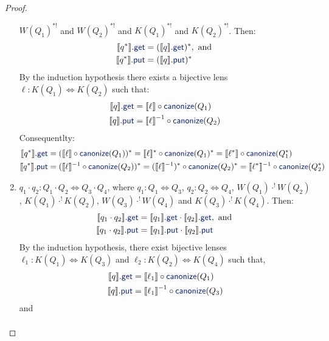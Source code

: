 \documentclass[acmsmall,review,anonymous]{acmart}
\newcommand{\kw}[1]{\textcolor{dkblue}{\ensuremath{\mathsf{#1}}}}
\newcommand{\canonize}{\ensuremath{\kw{canonize}}}
\newcommand{\get}{\ensuremath{\kw{get}}}
\newcommand{\lput}{\ensuremath{\kw{put}}}
\begin{document}
\begin{proof}
\begin{enumerate}
$W(Q_1)^{*!}$ and $W(Q_2)^{*!}$ and $K(Q_1)^{*!}$ and $K(Q_2)^{*!}$. Then:
\begin{align*}
\llbracket q^* \rrbracket.\get &= (\llbracket q \rrbracket.\get)^*, \text{
and }\\
\llbracket q^* \rrbracket.\lput &= (\llbracket q \rrbracket.\lput)^*
\end{align*}
By the induction hypothesis there exists a bijective lens $\ell : K(Q_1)
\Leftrightarrow K(Q_2)$ such that:
\begin{align*}
\llbracket q \rrbracket.\get &= \llbracket \ell \rrbracket \circ
\canonize(Q_1)\\
\llbracket q \rrbracket.\lput &= {\llbracket \ell \rrbracket}^{-1} \circ
\canonize(Q_2)
\end{align*}
Consequentlty:
\begin{align*}
\llbracket q^* \rrbracket.\get &= (\llbracket \ell \rrbracket \circ
\canonize(Q_1))^* = \llbracket \ell \rrbracket^* \circ
\canonize(Q_1)^* = \llbracket \ell^* \rrbracket \circ
\canonize(Q_1^*)\\
\llbracket q^* \rrbracket.\lput &= (\llbracket \ell \rrbracket^{-1} \circ
\canonize(Q_2))^* = (\llbracket \ell \rrbracket^{-1})^* \circ
\canonize(Q_2)^* = \llbracket \ell^* \rrbracket^{-1} \circ
\canonize(Q_2^*)\\
\end{align*}
\item
$q_1 \cdot q_2: Q_1 \cdot Q_2 \Leftrightarrow Q_3 \cdot Q_4$, where $q_1 : Q_1
\Leftrightarrow Q_3 $,  $q_2 : Q_2 \Leftrightarrow Q_4$, $W(Q_1)
\cdot^! W(Q_2)$, $K(Q_1) \cdot^! K(Q_2)$, $W(Q_3) \cdot^! W(Q_4)$ and $
K(Q_3) \cdot^! K(Q_4)$. Then:
\begin{align*}
\llbracket q_1 \cdot q_2 \rrbracket.\get &= \llbracket q_1 \rrbracket.\get \cdot
\llbracket q_2 \rrbracket.\get, \text{ and }\\
\llbracket q_1 \cdot q_2 \rrbracket.\lput &= \llbracket q_1 \rrbracket.\lput
\cdot \llbracket q_2 \rrbracket.\lput
\end{align*}
By the induction hypothesis, there exist bijective lenses $\ell_1 : K(Q_1)
\Leftrightarrow K(Q_3)$ and $\ell_2 : K(Q_2) \Leftrightarrow K(Q_4)$ such that,
\begin{align*}
\llbracket q \rrbracket.\get &= \llbracket \ell_1 \rrbracket \circ
\canonize(Q_1)\\
\llbracket q \rrbracket.\lput &= {\llbracket \ell_1 \rrbracket}^{-1} \circ
\canonize(Q_3)
\end{align*}
and
\begin{align*}

\end{align*}
\end{enumerate}
\end{proof}
\end{document}
